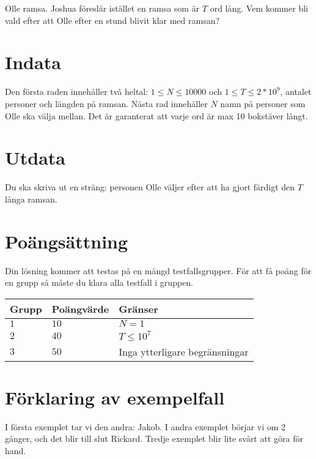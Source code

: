 Olle ramsa. 
Joshua föreslår istället en ramsa som är $T$ ord lång. Vem kommer bli vald efter att Olle efter en stund blivit klar med ramsan?

\section*{Indata}
Den första raden innehåller två heltal: $1 \leq N \leq 10000$ och $1\leq T \leq 2*10^9$, antalet personer och längden på ramsan.
Nästa rad innehåller $N$ namn på personer som Olle ska välja mellan.
Det är garanterat att varje ord är max 10 bokstäver långt.

\section*{Utdata}
Du ska skriva ut en sträng: personen Olle väljer efter att ha gjort färdigt den $T$ långa ramsan.

\section*{Poängsättning}
Din lösning kommer att testas på en mängd testfallsgrupper.
För att få poäng för en grupp så måste du klara alla testfall i gruppen.

\noindent
\begin{tabular}{| l | l | p{12cm} |}
  \hline
  Grupp & Poängvärde & Gränser \\ \hline
  $1$   & $10$       & $N=1$ \\ \hline
  $2$   & $40$       & $T \leq 10^7$ \\ \hline
  $3$   & $50$       & Inga ytterligare begränsningar \\ \hline
\end{tabular}

\section*{Förklaring av exempelfall}
I första exemplet tar vi den andra: Jakob.
I andra exemplet börjar vi om 2 gånger, och det blir till slut Rickard.
Tredje exemplet blir lite svårt att göra för hand.